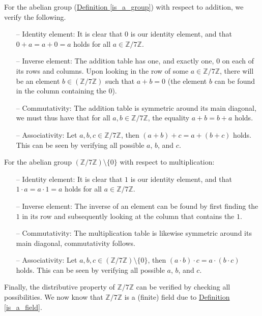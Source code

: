 \documentclass[openany, a4paper, 10pt]{book}
\theoremstyle{plain}
\theoremstyle{plain}
\theoremstyle{plain}
\theoremstyle{definition}
\theoremstyle{plain}
\theoremstyle{definition}
\theoremstyle{remark}
\newcommand{\defref}[1]{\hyperref[#1]{Definition \ref{#1}}}
\begin{document}
\begin{examplebox}
\begin{figure}[H]
\begin{minipage}{.5\textwidth}
\begin{tabular}{c|ccccccc}
            \end{tabular}
        \end{minipage}
        \vspace{-.5em}
    \end{figure}
    For the abelian group (\defref{is_a_group}) with respect to addition, we verify the following.
    \begin{itemize}
        \item[--] Identity element: It is clear that $0$ is our identity element, and that $0 + a = a + 0 = a$ holds for all $a\in \mathbb Z / 7 \mathbb Z$.
        \item[--] Inverse element: The addition table has one, and exactly one, $0$ on each of its rows and columns.
            Upon looking in the row of some $a\in \mathbb Z / 7 \mathbb Z$,
            there will be an element $b\in (\mathbb Z / 7 \mathbb Z)$ such that $a+b=0$ (the element $b$ can be found in the column containing the 0).
        \item[--] Commutativity: The addition table is symmetric around its main diagonal, we must thus have that for all $a,b\in \mathbb Z / 7 \mathbb Z$, the equality $a+b = b+a$ holds.
        \item[--] Associativity: Let $a,b,c \in \mathbb Z / 7 \mathbb Z$, then $(a+b)+c = a+(b+c)$ holds.
            This can be seen by verifying all possible $a$, $b$, and $c$.
    \end{itemize}
    For the abelian group $(\mathbb Z / 7 \mathbb Z) \setminus \{ 0 \}$ with respect to multiplication:
    \begin{itemize}
        \item[--] Identity element: It is clear that $1$ is our identity element, and that $1 \cdot a = a \cdot 1 = a$ holds for all $a\in \mathbb Z / 7 \mathbb Z$.
        \item[--] Inverse element: The inverse of an element can be found by first finding the $1$ in its row and subsequently looking at the column that contains the $1$.
        \item[--] Commutativity: The multiplication table is likewise symmetric around its main diagonal, commutativity follows.
        \item[--] Associativity: Let $a,b,c \in (\mathbb Z / 7 \mathbb Z) \setminus \{ 0 \}$, then $(a\cdot b)\cdot c = a\cdot (b\cdot c)$ holds.
            This can be seen by verifying all possible $a$, $b$, and $c$.
    \end{itemize}
    Finally, the distributive property of $\mathbb Z / 7 \mathbb Z$ can be verified by checking all possibilities.
    We now know that $\mathbb Z / 7 \mathbb Z$ is a (finite) field due to \defref{is_a_field}.
\end{examplebox}
\end{document}
